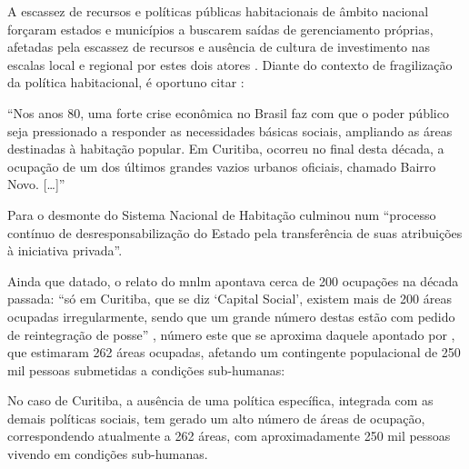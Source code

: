 	A escassez de recursos e políticas públicas habitacionais de âmbito nacional forçaram estados e municípios a buscarem saídas de gerenciamento próprias, afetadas pela escassez de recursos e ausência de cultura de investimento nas escalas local e regional por estes dois atores \cite[p. 82]{colin2009a}. Diante do contexto de fragilização da política habitacional, é oportuno citar :
	
	\begin{citacao}
		``Nos anos 80, uma forte crise econômica no Brasil faz com que o poder público seja pressionado a responder as necessidades básicas sociais, ampliando as áreas destinadas à habitação popular. Em Curitiba, ocorreu no final desta década, a ocupação de um dos últimos grandes vazios urbanos oficiais, chamado Bairro Novo. [\dots]'' \cite[p. 54]{castro2005a}
	\end{citacao}

	Para  o desmonte do Sistema Nacional de Habitação culminou num ``processo contínuo de desresponsabilização do Estado pela transferência de suas atribuições à iniciativa privada''.
	
	Ainda que datado, o relato do \gls{mnlm} apontava cerca de 200 ocupações na década passada: ``só em Curitiba, que se diz `Capital Social', existem mais de 200 áreas ocupadas irregularmente, sendo que um grande número destas estão com pedido de reintegração de posse'' \cite[p. 127]{hilma2009a}, número este que se aproxima daquele apontado por , que estimaram 262 áreas ocupadas, afetando um contingente populacional de 250 mil pessoas submetidas a condições sub-humanas:
	
	\begin{citacao}
		No caso de Curitiba, a ausência de uma política específica, integrada com as demais políticas sociais, tem gerado um alto número de áreas de ocupação, correspondendo atualmente a 262 áreas, com aproximadamente 250 mil pessoas vivendo em condições sub-humanas.
	\end{citacao}
	
